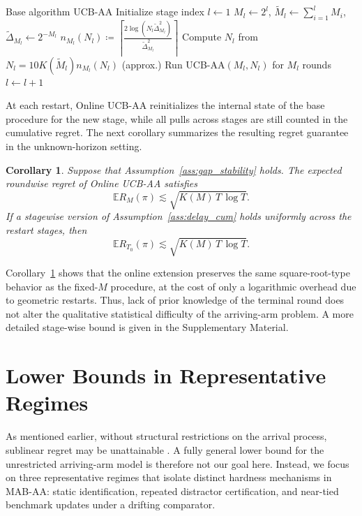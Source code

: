 \documentclass[11pt]{article}
\newtheorem{corollary}{Corollary}
\begin{document}
\begin{algorithm}[htbp]
\caption{Online UCB-AA}
\label{alg:online-ucb-aa}
\begin{algorithmic}[1]
\Require Base algorithm UCB-AA
\State Initialize stage index $l \leftarrow 1$
    \State $M_l\leftarrow2^l$, $\tilde{M}_l\leftarrow\sum_{i=1}^l M_i$, $\tilde{\Delta}_{M_l}\leftarrow2^{-M_l}$
    \State $n_{M_l}(N_l)\coloneqq\left\lceil\frac{2\log(N_l\tilde{\Delta}_{M_l}^2)}{\tilde{\Delta}_{M_l}^2}\right\rceil$
    \State Compute $N_l$ from $N_l=10K(\tilde{M}_l)n_{M_l}(N_l)$ (approx.)
    \State Run UCB-AA$(M_l,N_l)$ for $M_l$ rounds
    \State $l \leftarrow l+1$
\EndWhile
\end{algorithmic}
\end{algorithm}

At each restart, Online UCB-AA reinitializes the internal state of the base
procedure for the new stage, while all pulls across stages are still counted in
the cumulative regret.
The next corollary summarizes the resulting regret guarantee in the unknown-horizon setting.

\begin{corollary}
\label{cor:online_gap_independent}
Suppose that Assumption~\ref{ass:gap_stability} holds.
The expected roundwise regret of Online UCB-AA satisfies
\[
\mathbb{E}R_M(\pi) \lesssim \sqrt{K(M)\,T\,\log T}.
\]
If a stagewise version of Assumption~\ref{ass:delay_cum} holds uniformly across the restart stages,
then
\[
\mathbb{E}R_{T_0}(\pi) \lesssim \sqrt{K(M)\,T\,\log T}.
\]
\end{corollary}

Corollary~\ref{cor:online_gap_independent} shows that the online extension preserves the same square-root-type behavior as the fixed-\(M\) procedure, at the cost of only a logarithmic overhead due to geometric restarts. Thus, lack of prior knowledge of the terminal round does not alter the qualitative statistical difficulty of the arriving-arm problem. A more detailed stage-wise bound is given in the Supplementary Material.


\section{Lower Bounds in Representative Regimes}
\label{sec:lowerbound}

As mentioned earlier, without structural restrictions on the arrival process, sublinear regret may be unattainable
\parencite{ghalme2021ballooning}. A fully general lower bound for the unrestricted arriving-arm model is therefore not our goal here. Instead, we focus on three representative regimes that isolate distinct hardness mechanisms in MAB-AA: static identification, repeated distractor certification, and near-tied benchmark updates under a drifting comparator.
\end{document}
